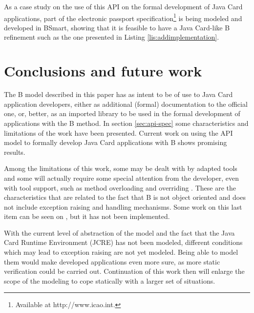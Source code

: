 \documentclass{entcs}
\begin{document}
As a case study on the use of this API on the formal development of Java Card applications, part of the electronic passport specification\footnote{Available at http://www.icao.int.} is being modeled and developed in BSmart, showing that it is feasible to have a Java Card-like B refinement  such as the one presented in Listing \ref{lis:addimplementation}.

\section{Conclusions and future work}\label{sec:conc}

The B model described in this paper has as intent to be of use to Java Card application developers, either as additional (formal) documentation to the official one, or, better, as an imported library to be used in the formal development of applications with the B method. In section \ref{sec:api-spec} some characteristics and limitations of the work have been presented. Current work on using the API model to formally develop Java Card applications with B shows promising results. 

Among the limitations of this work, some may be dealt with by adapted tools and some will actually require some special attention from the developer, even with tool support, such as method overloading and overriding . These are the characteristics that are related to the fact that B is not object oriented and does not include exception raising and handling mechanisms. Some work on this last item can be seen on \cite{BR2003}, but it has not been implemented.

With the current level of abstraction of the model and the fact that the Java Card Runtime Environment (JCRE) has not been modeled, different conditions which may lead to exception raising are not yet modeled. Being able to model them would make developed applications even more sure, as more static verification could be carried
out. Continuation of this work then will enlarge the scope of the modeling to cope statically with a larger set of situations.




\end{document}
